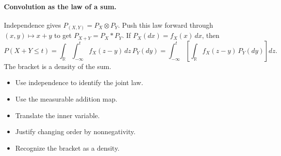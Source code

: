 \documentclass[11pt,letterpaper]{article}
\begin{document}
\hypertarget{answer-l8-s12}{}\paragraph{Convolution as the law of a sum.}
Independence gives $P_{(X,Y)}=P_X\otimes P_Y$. Push this law forward through $(x,y)\mapsto x+y$ to get $P_{X+Y}=P_X*P_Y$. If $P_X(dx)=f_X(x)\,dx$, then \[P(X+Y\le t)=\int_{\mathbb R}\int_{-\infty}^{t}f_X(z-y)\,dz\,P_Y(dy)=\int_{-\infty}^{t}\left[\int_{\mathbb R}f_X(z-y)\,P_Y(dy)\right]dz.\] The bracket is a density of the sum.
\begin{itemize}
\item Use independence to identify the joint law.
\item Use the measurable addition map.
\item Translate the inner variable.
\item Justify changing order by nonnegativity.
\item Recognize the bracket as a density.
\end{itemize}
\end{document}
